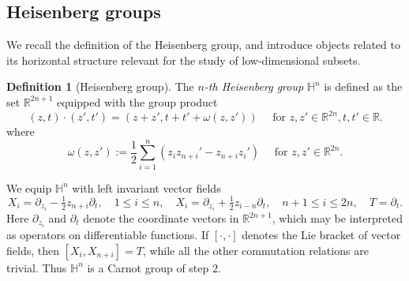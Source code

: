 \documentclass[12pt]{amsart}
\newcommand{\R}{\mathbb R}
\renewcommand{\H}{\mathbb H}
\numberwithin{equation}{section}
\theoremstyle{plain}
\theoremstyle{definition}
\newtheorem{definition}[theorem]{Definition}
\theoremstyle{remark}
\begin{document}
\subsection{Heisenberg groups}
We recall the definition of the Heisenberg group, and introduce objects related to its horizontal structure  relevant for the study of low-dimensional subsets.
\begin{definition}[Heisenberg group] The \textit{$n$-th Heisenberg group} $\H^n$ is defined as the set $\R^{2n+1}$ equipped with the group product
  \begin{equation}\label{grouplaw} (z,t)\cdot(z',t')=(z+z', t+t'+\omega(z,z'))\quad\text{ for }z,z'\in\R^{2n},t,t'\in\R.\end{equation}
  where \begin{equation}\label{hform}\omega(z,z'):=\frac{1}{2}\sum_{i=1}^n (z_i z_{n+i}'-z_{n+i}z_i')\quad\text{ for }z,z'\in \R^{2n}.\end{equation}
\end{definition}
\noindent We equip $\mathbb{H}^{n}$ with left invariant vector fields 
\[X_{i}=\partial_{z_{i}}-\tfrac{1}{2}z_{n+i}\partial_{t},\quad 1\leq i\leq n, \quad X_{i} = \partial_{z_{i}}+\tfrac{1}{2}z_{i-n}\partial_{t}, \quad n+1\leq i\leq 2n, \quad T=\partial_{t}.\]
Here $\partial_{z_{i}}$ and $\partial_{t}$ denote the coordinate vectors in $\mathbb{R}^{2n+1}$, which may be interpreted as operators on differentiable functions. If $[\cdot, \cdot]$ denotes the Lie bracket of vector fields, then $[X_{i}, X_{n+i}]=T$, while all the other commutation relations are trivial. Thus $\mathbb{H}^{n}$ is a Carnot group of step $2$.
\end{document}
